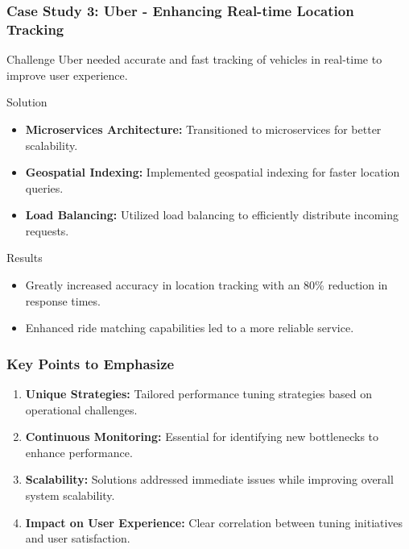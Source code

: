 \documentclass{beamer}
\begin{document}
\begin{frame}[fragile]
    \frametitle{Case Study 3: Uber - Enhancing Real-time Location Tracking}
    \begin{block}{Challenge}
        Uber needed accurate and fast tracking of vehicles in real-time to improve user experience.
    \end{block}

    \begin{block}{Solution}
        \begin{itemize}
            \item \textbf{Microservices Architecture:} Transitioned to microservices for better scalability.
            \item \textbf{Geospatial Indexing:} Implemented geospatial indexing for faster location queries.
            \item \textbf{Load Balancing:} Utilized load balancing to efficiently distribute incoming requests.
        \end{itemize}
    \end{block}

    \begin{block}{Results}
        \begin{itemize}
            \item Greatly increased accuracy in location tracking with an 80\% reduction in response times.
            \item Enhanced ride matching capabilities led to a more reliable service.
        \end{itemize}
    \end{block}
\end{frame}

\begin{frame}[fragile]
    \frametitle{Key Points to Emphasize}
    \begin{enumerate}
        \item \textbf{Unique Strategies:} Tailored performance tuning strategies based on operational challenges.
        \item \textbf{Continuous Monitoring:} Essential for identifying new bottlenecks to enhance performance.
        \item \textbf{Scalability:} Solutions addressed immediate issues while improving overall system scalability.
        \item \textbf{Impact on User Experience:} Clear correlation between tuning initiatives and user satisfaction.
    \end{enumerate}
\end{frame}
\end{document}
